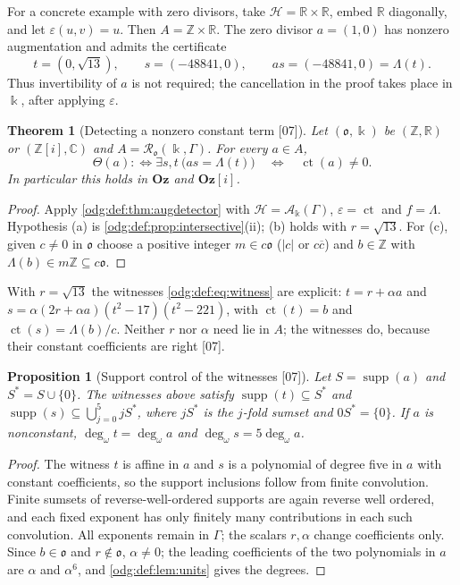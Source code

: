 \documentclass[11pt,oneside]{article}
\numberwithin{equation}{section}
\newtheorem{theorem}{Theorem}[section]
\newtheorem{proposition}[proposition]{Proposition}
\theoremstyle{definition}
\theoremstyle{remark}
\newcommand{\Oz}{\mathbf{Oz}}
\newcommand{\Z}{\mathbb Z}
\newcommand{\R}{\mathbb R}
\newcommand{\C}{\mathbb C}
\newcommand{\ct}{\operatorname{ct}}
\newcommand{\supp}{\operatorname{supp}}
\newcommand{\ddeg}{\operatorname{deg}_{\omega}}
\newcommand{\src}[1]{\textup{\textsf{\small[#1]}}}
\newcommand{\Og}{\Oz[i]}
\begin{document}
For a concrete example with zero divisors, take $\mathcal H=\R\times\R$,
embed $\R$ diagonally, and let $\varepsilon(u,v)=u$. Then
$A=\Z\times\R$. The zero divisor $a=(1,0)$ has nonzero augmentation and
admits the certificate
\[
 t=(0,\sqrt{13}),\qquad s=(-48841,0),\qquad
 as=(-48841,0)=\Lambda(t).
\]
Thus invertibility of $a$ is not required; the cancellation in the proof
takes place in $\Bbbk$, after applying $\varepsilon$.

\begin{theorem}[Detecting a nonzero constant term \src{07}]\label{odg:def:thm:detector}
Let $(\mathfrak o,\Bbbk)$ be $(\Z,\R)$ or $(\Z[i],\C)$ and
$A=\mathcal R_{\mathfrak o}(\Bbbk,\Gamma)$. For every $a\in A$,
\begin{equation}\label{odg:def:eq:detector}
 \Theta(a):\Longleftrightarrow\exists s,t\ \bigl(as=\Lambda(t)\bigr)
 \quad\Longleftrightarrow\quad\ct(a)\ne0 .
\end{equation}
In particular this holds in $\Oz$ and $\Og$.
\end{theorem}
\begin{proof}
Apply \cref{odg:def:thm:augdetector} with $\mathcal H=\mathcal A_\Bbbk(\Gamma)$,
$\varepsilon=\ct$ and $f=\Lambda$. Hypothesis (a) is
\cref{odg:def:prop:intersective}(ii); (b) holds with $r=\sqrt{13}$. For (c),
given $c\ne0$ in $\mathfrak o$ choose a positive integer $m\in c\mathfrak o$
($|c|$ or $c\overline c$) and $b\in\Z$ with $\Lambda(b)\in m\Z\subseteq
c\mathfrak o$.
\end{proof}

With $r=\sqrt{13}$ the witnesses \eqref{odg:def:eq:witness} are explicit:
$t=r+\alpha a$ and $s=\alpha(2r+\alpha a)(t^2-17)(t^2-221)$, with
$\ct(t)=b$ and $\ct(s)=\Lambda(b)/c$. Neither $r$ nor $\alpha$ need lie in $A$;
the witnesses do, because their constant coefficients are right \src{07}.

\begin{proposition}[Support control of the witnesses \src{07}]\label{odg:def:prop:support}
Let $S=\supp(a)$ and $S^\ast=S\cup\{0\}$. The witnesses above satisfy
$\supp(t)\subseteq S^\ast$ and $\supp(s)\subseteq\bigcup_{j=0}^5jS^\ast$,
where $jS^\ast$ is the $j$-fold sumset and $0S^\ast=\{0\}$. If $a$ is
nonconstant, $\ddeg t=\ddeg a$ and $\ddeg s=5\ddeg a$.
\end{proposition}
\begin{proof}
The witness $t$ is affine in $a$ and $s$ is a polynomial of degree five in
$a$ with constant coefficients, so the support inclusions follow from finite
convolution. Finite sumsets of reverse-well-ordered supports are again
reverse well ordered, and each fixed exponent has only finitely many
contributions in each such convolution. All exponents remain in $\Gamma$;
the scalars $r,\alpha$ change coefficients only.
Since $b\in\mathfrak o$ and $r\notin\mathfrak o$, $\alpha\ne0$; the
leading coefficients of the two polynomials in $a$ are $\alpha$ and
$\alpha^6$, and \cref{odg:def:lem:units} gives the degrees.
\end{proof}
\end{document}
